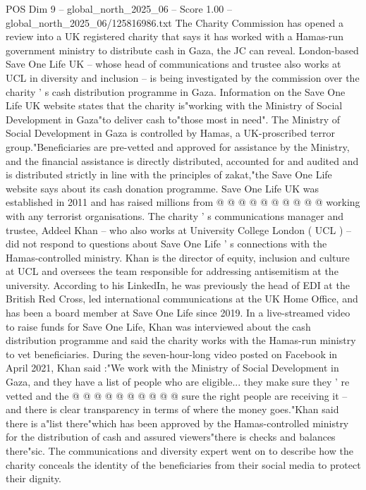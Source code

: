 \begin{textsample}{POS Dim 9 – global\_north\_2025\_06 – Score 1.00 – global\_north\_2025\_06/125816986.txt}  \label{ex:f9_pos_349}
The Charity Commission has opened a review into a UK registered charity that says it has worked with a Hamas-run government ministry to distribute cash in Gaza, the JC can reveal.
London-based Save One Life UK -- whose head of communications and trustee also works at UCL in diversity and inclusion -- is being investigated by the commission over the charity ' s cash distribution programme in Gaza.
Information on the Save One Life UK website states that the charity is"working with the Ministry of Social Development in Gaza"to deliver cash to"those most in need".
The Ministry of Social Development in Gaza is controlled by Hamas, a UK-proscribed terror group."Beneficiaries are pre-vetted and approved for assistance by the Ministry, and the financial assistance is directly distributed, accounted for and audited and is distributed strictly in line with the principles of zakat,"the Save One Life website says about its cash donation programme.
Save One Life UK was established in 2011 and has raised millions from @ @ @ @ @ @ @ @ @ @ working with any terrorist organisations.
The charity ' s communications manager and trustee, Addeel Khan -- who also works at University College London ( UCL ) -- did not respond to questions about Save One Life ' s connections with the Hamas-controlled ministry.
Khan is the director of equity, inclusion and culture at UCL and oversees the team responsible for addressing antisemitism at the university.
According to his LinkedIn, he was previously the head of EDI at the British Red Cross, led international communications at the UK Home Office, and has been a board member at Save One Life since 2019.
In a live-streamed video to raise funds for Save One Life, Khan was interviewed about the cash distribution programme and said the charity works with the Hamas-run ministry to vet beneficiaries.
During the seven-hour-long video posted on Facebook in April 2021, Khan said :"We work with the Ministry of Social Development in Gaza, and they have a list of people who are eligible... they make sure they ' re vetted and the @ @ @ @ @ @ @ @ @ @ sure the right people are receiving it -- and there is clear transparency in terms of where the money goes."Khan said there is a"list there"which has been approved by the Hamas-controlled ministry for the distribution of cash and assured viewers"there is checks and balances there"sic.
The communications and diversity expert went on to describe how the charity conceals the identity of the beneficiaries from their social media to protect their dignity.

\end{textsample}
